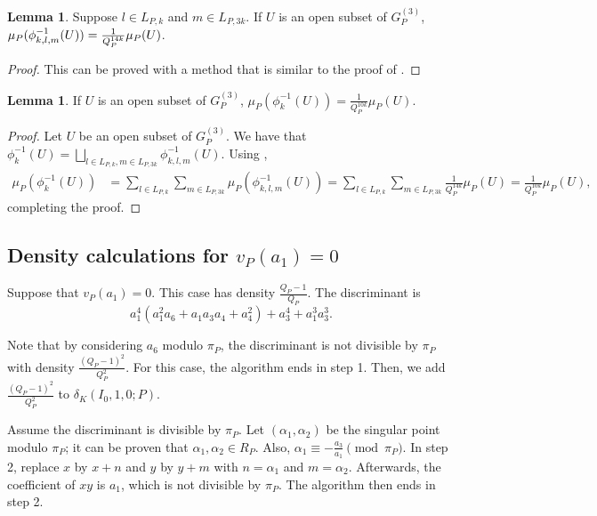 \documentclass[12pt,letterpaper]{amsart}
\theoremstyle{definition}
\newtheorem{lemma}[theorem]{Lemma}
\begin{document}
\begin{lemma}
\label{invdensitymult3a}
Suppose $l\in L_{P,k}$ and $m\in L_{P, 3k}$. If $U$ is an open subset of $G_P^{(3)}$, $\mu_P(\phi_{k,l,m}^{-1}(U))\\=\frac{1}{Q_P^{14k}}\mu_P(U)$.
\end{lemma}
\begin{proof}
This can be proved with a method that is similar to the proof of .
\end{proof}

\begin{lemma} 
\label{invdensitymult3b}
If $U$ is an open subset of $G_P^{(3)}$, $\mu_P(\phi_k^{-1}(U))=\frac{1}{Q_P^{10k}}\mu_P(U)$.
\end{lemma}

\begin{proof}
Let $U$ be an open subset of $G_P^{(3)}$. We have that $\phi_k^{-1}(U)=\bigsqcup_{l\in L_{P,k}, m\in L_{P,3k}}\phi_{k,l,m}^{-1}(U)$. Using ,
\begin{align*}
\mu_P(\phi_k^{-1}(U))& =\sum_{l\in L_{P,k}}\sum_{m\in L_{P,3k}}\mu_P(\phi_{k,l,m}^{-1}(U))= \sum_{l\in L_{P,k}}\sum_{m\in L_{P,3k}} \frac{1}{Q_P^{14k}}\mu_P(U)= \frac{1}{Q_P^{10k}}\mu_P(U),
\end{align*}
completing the proof.
\end{proof}

\subsection{Density calculations for \texorpdfstring{$v_P(a_1)=0$}{}}

Suppose that $v_P(a_1)=0$. This case has density $\frac{Q_P-1}{Q_P}$. The discriminant is
\[
a_1^4(a_1^2a_6+a_1a_3a_4+a_4^2)+a_3^4+a_1^3a_3^3.
\]

Note that by considering $a_6$ modulo $\pi_P$, the discriminant is not divisible by $\pi_P$ with density $\frac{(Q_P-1)^2}{Q_P^2}$. For this case, the algorithm ends in step 1. Then, we add $\frac{(Q_P-1)^2}{Q_P^2}$ to $\delta_K(I_0,1,0;P)$.

Assume the discriminant is divisible by $\pi_P$. Let $(\alpha_1, \alpha_2)$ be the singular point modulo $\pi_P$; it can be proven that $\alpha_1, \alpha_2 \in R_P$. Also, $\alpha_1\equiv-\frac{a_3}{a_1}\pmod{\pi_P}$. In step 2, replace $x$ by $x+n$ and $y$ by $y+m$ with $n=\alpha_1$ and $m=\alpha_2$. Afterwards, the coefficient of $xy$ is $a_1$, which is not divisible by $\pi_P$. The algorithm then ends in step 2. 
\end{document}
